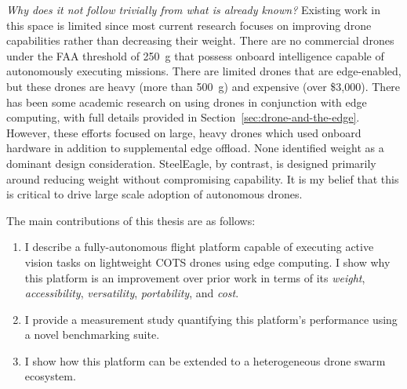 \textit{Why does it not follow trivially from what is already known?} Existing work in this space is limited since most current research focuses on improving drone capabilities rather than decreasing their weight. There are no commercial drones under the FAA threshold of 250~g that possess onboard intelligence capable of autonomously executing  missions. There are limited drones that are edge-enabled, but these drones are heavy (more than 500~g) and expensive (over \$3,000). There has been some academic research on using drones in conjunction with edge computing, with full details provided in Section~\ref{sec:drone-and-the-edge}. However, these efforts focused on large, heavy drones which used onboard hardware in addition to supplemental edge offload. None identified weight as a dominant design consideration. SteelEagle, by contrast, is designed primarily around reducing weight without compromising capability. It is my belief that this is critical to drive large scale adoption of autonomous drones. 

\begin{flushleft}
The main contributions of this thesis are as follows:
\end{flushleft}
\begin{enumerate}
\item I describe a fully-autonomous flight platform capable of executing active vision tasks on lightweight COTS drones using edge computing. I show why this platform is an improvement over prior work in terms of its \textit{weight}, \textit{accessibility}, \textit{versatility}, \textit{portability}, and \textit{cost}.
\item I provide a measurement study quantifying this platform's performance using a novel benchmarking suite.
\item I show how this platform can be extended to a heterogeneous drone swarm ecosystem.  
\end{enumerate}

 

